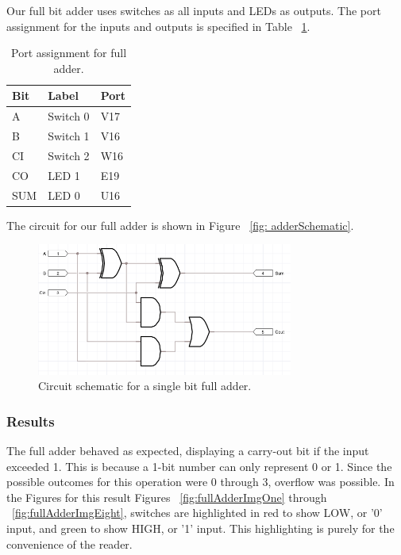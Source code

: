 \documentclass[11pt]{article}
\begin{document}
Our full bit adder uses switches as all inputs and LEDs as outputs. The port assignment for the inputs and outputs is specified in Table ~\ref{tab:fullAddPorts}.

\begin{table}[h]
\begin{center}
	\begin{tabular}{| l | l | l |}
		\hline
		Bit & Label & Port \\ \hline
		A & Switch 0 & V17 \\ \hline
		B & Switch 1 & V16 \\ \hline
		CI & Switch 2 & W16 \\ \hline
		CO & LED 1 & E19 \\ \hline
		SUM & LED 0 & U16 \\ \hline
	\end{tabular}
	\caption{\label{tab:fullAddPorts}Port assignment for full adder.}
	\label{tab:fullAddPorts}
\end{center}	
\end{table}

The circuit for our full adder is shown in Figure ~\ref{fig: adderSchematic}.

\begin{figure}[H]
\begin{center}
	\includegraphics[width=0.75\textwidth]{report-images/img4.png}
	\caption{\label{fig: adderSchematic} Circuit schematic for a single bit full adder.}
	\label{fig:adderSchematic}
\end{center}
\end{figure}

\subsubsection{Results}

The full adder behaved as expected, displaying a carry-out bit if the input exceeded 1. This is because a 1-bit number can only represent 0 or 1. Since the possible outcomes for this operation were 0 through 3, overflow was possible. In the Figures for this result Figures ~\ref{fig:fullAdderImgOne} through ~\ref{fig:fullAdderImgEight}, switches are highlighted in red to show LOW, or '0' input, and green to show HIGH, or '1' input. This highlighting is purely for the convenience of the reader.
\end{document}
